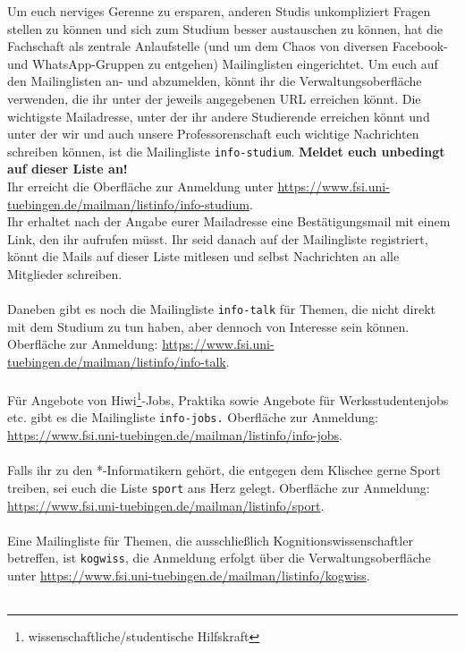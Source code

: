 Um euch nerviges Gerenne zu ersparen, anderen Studis unkompliziert Fragen stellen zu können und
sich zum Studium besser austauschen zu können, hat die Fachschaft als zentrale Anlaufstelle (und um dem Chaos von diversen Facebook- und WhatsApp-Gruppen zu entgehen) Mailinglisten eingerichtet. 
Um euch auf den Mailinglisten an- und abzumelden, könnt ihr die Verwaltungsoberfläche verwenden, die ihr unter der jeweils angegebenen URL erreichen könnt.
Die wichtigste Mailadresse, unter der ihr andere Studierende erreichen könnt und unter der wir und auch unsere Professorenschaft euch wichtige Nachrichten schreiben können, ist die Mailingliste \texttt{info-studium}. \textbf{Meldet euch unbedingt auf dieser Liste an!}\\
Ihr erreicht die Oberfläche zur Anmeldung unter \url{https://www.fsi.uni-tuebingen.de/mailman/listinfo/info-studium}. \\
Ihr erhaltet nach der Angabe eurer Mailadresse eine Bestätigungsmail mit einem Link, den ihr aufrufen müsst. Ihr seid danach auf der Mailingliste registriert, könnt die Mails auf dieser Liste mitlesen und selbst Nachrichten an alle Mitglieder schreiben. \\\\
Daneben gibt es noch die Mailingliste \texttt{info-talk} für Themen, die nicht direkt mit dem Studium
zu tun haben, aber dennoch von Interesse sein können. Oberfläche zur Anmeldung: \url{https://www.fsi.uni-tuebingen.de/mailman/listinfo/info-talk}. \\\\
Für Angebote von Hiwi\footnote{wissenschaftliche/studentische Hilfskraft}-Jobs, Praktika sowie Angebote für Werksstudentenjobs etc. gibt es die Mailingliste \texttt{info-jobs.} Oberfläche zur Anmeldung: \url{https://www.fsi.uni-tuebingen.de/mailman/listinfo/info-jobs}.\\\\
Falls ihr zu den *-Informatikern gehört, die entgegen dem Klischee gerne Sport treiben, sei euch die Liste \texttt{sport} ans Herz gelegt. Oberfläche zur Anmeldung: \url{https://www.fsi.uni-tuebingen.de/mailman/listinfo/sport}. \\\\
\ifkogwiss 
Eine Mailingliste für Themen, die ausschließlich Kognitionswissenschaftler betreffen, ist
\texttt{kogwiss}, die Anmeldung erfolgt über die Verwaltungsoberfläche unter \url{https://www.fsi.uni-tuebingen.de/mailman/listinfo/kogwiss}. \\\\
